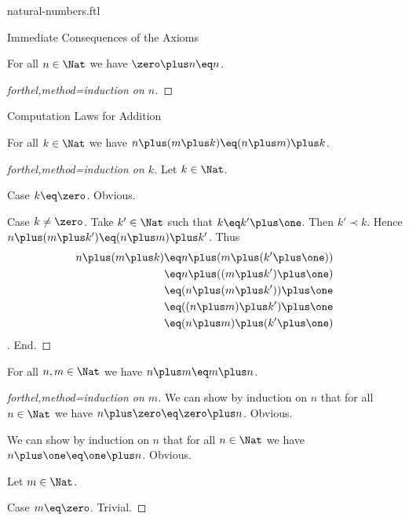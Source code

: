 \documentclass{naproche-library}
\begin{document}
\begin{smodule}[title=Natural Numbers]{natural-numbers.ftl}
\begin{sfragment}{Immediate Consequences of the Axioms}
  \begin{proposition}[forthel,id=ZeroIsLeftIdentityOfPlusProp]
    For all $n\in\Nat$ we have $\zero\plus n\eq n$.
  \end{proposition}
  \begin{proof}[forthel,method=induction on $n$]\end{proof}
\end{sfragment}

\begin{sfragment}{Computation Laws for Addition}
  \begin{proposition}[forthel,title=Associativity,id=PlusIsAssociativeProp]
    For all $k\in\Nat$ we have $n\plus(m\plus k)\eq(n\plus m)\plus k$.
  \end{proposition}
  \begin{proof}[forthel,method=induction on $k$]
    Let $k\in\Nat$.

    Case $k\eq\zero$. Obvious.

    Case $k\neq\zero$.
      Take $k'\in\Nat$ such that $k\eq k'\plus\one$.
      Then $k'\prec k$.
      Hence $n\plus(m\plus k')\eq(n\plus m)\plus k'$.
      Thus
      \begin{align*}
        n\plus(m\plus k)
          &\eq n\plus(m\plus(k'\plus\one))\\
          &\eq n\plus((m\plus k')\plus\one)\\
          &\eq (n\plus(m\plus k'))\plus\one\\
          &\eq ((n\plus m)\plus k')\plus\one\\
          &\eq (n\plus m)\plus(k'\plus\one)
      \end{align*}.
    End.
  \end{proof}

  \begin{proposition}[forthel,title=Commutativity,id=PlusIsCommutativeProp]
    For all $n,m\in\Nat$ we have $n\plus m\eq m\plus n$.
  \end{proposition}
  \begin{proof}[forthel,method=induction on $m$]
    We can show by induction on $n$ that for all $n\in\Nat$ we have $n\plus\zero\eq\zero\plus n$.
    Obvious.

    We can show by induction on $n$ that for all $n\in\Nat$ we have $n\plus\one\eq\one\plus n$.
    Obvious.

    Let $m\in\Nat$.

    Case $m\eq\zero$. Trivial.


\end{proof}
\end{sfragment}
\end{smodule}
\end{document}
